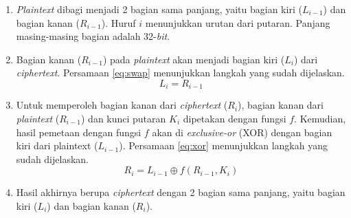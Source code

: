 \begin{enumerate}
	\item \textit{Plaintext} dibagi menjadi 2 bagian sama panjang, yaitu bagian kiri (\begin{math}L_{i-1}\end{math}) dan bagian kanan (\begin{math}R_{i-1}\end{math}). Huruf \begin{math}i\end{math} menunjukkan urutan dari putaran. Panjang masing-masing bagian adalah 32-\textit{bit}.
	\item Bagian kanan (\begin{math}R_{i-1}\end{math}) pada \textit{plaintext} akan menjadi bagian kiri (\begin{math}L_i\end{math}) dari \textit{ciphertext}. Persamaan \ref{eq:swap} menunjukkan langkah yang sudah dijelaskan.
	\begin{equation}
		L_i = R_{i-1}
		\label{eq:swap}
	\end{equation}
	\item Untuk memperoleh bagian kanan dari \textit{ciphertext} (\begin{math}R_i\end{math}), bagian kanan dari \textit{plaintext} (\begin{math}R_{i-1}\end{math}) dan kunci putaran \begin{math}K_i\end{math} dipetakan dengan fungsi \begin{math}f\end{math}. Kemudian, hasil pemetaan dengan fungsi \begin{math}f\end{math} akan di \textit{exclusive-or} (XOR) dengan bagian kiri dari plaintext (\begin{math}L_{i-1}\end{math}). Persamaan \ref{eq:xor} menunjukkan langkah yang sudah dijelaskan.
	\begin{equation}
		R_i = L_{i-1} \oplus f(R_{i-1}, K_i)
		\label{eq:xor}
	\end{equation}
	\item Hasil akhirnya berupa \textit{ciphertext} dengan 2 bagian sama panjang, yaitu bagian kiri (\begin{math}L_i\end{math}) dan bagian kanan (\begin{math}R_i\end{math}). 
\end{enumerate}

